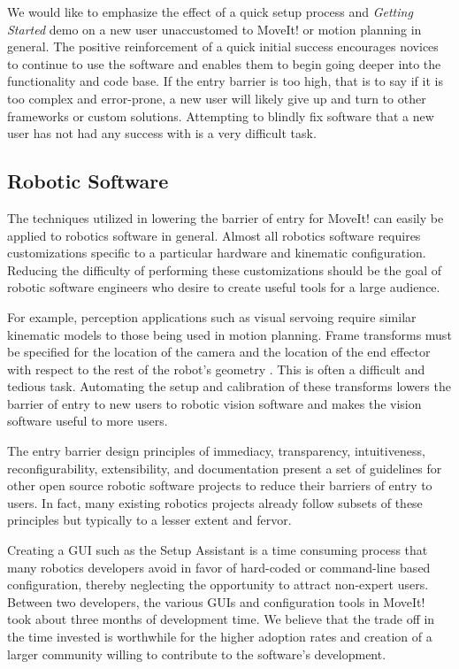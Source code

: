 \documentclass[10pt,journal,compsoc]{joser1}
\begin{document}
{We would like to emphasize the effect of a quick setup process and \textit{Getting Started} demo on a new user unaccustomed to MoveIt! or motion planning in general. The positive reinforcement of a quick initial success encourages novices to continue to use the software and enables them to begin going deeper into the functionality and code base. If the entry barrier is too high, that is to say if it is too complex and error-prone, a new user will likely give up and turn to other frameworks or custom solutions. Attempting to blindly fix software that a new user has not had any success with is a very difficult task.

\subsection{Robotic Software}
\label{sec::robotic_discussion}

The techniques utilized in lowering the barrier of entry for MoveIt! can easily be applied to robotics software in general. Almost all robotics software requires customizations specific to a particular hardware and kinematic configuration. Reducing the difficulty of performing these customizations should be the goal of robotic software engineers who desire to create useful tools for a large audience. 

For example, perception applications such as visual servoing require similar kinematic models to those being used in motion planning. Frame transforms must be specified for the location of the camera and the location of the end effector with respect to the rest of the robot's geometry \cite{visual_servoing}. This is often a difficult and tedious task. Automating the setup and calibration of these transforms lowers the barrier of entry to new users to robotic vision software and makes the vision software useful to more users.

The entry barrier design principles of immediacy, transparency, intuitiveness, reconfigurability, extensibility, and documentation present a set of guidelines for other open source robotic software projects to reduce their barriers of entry to users. In fact, many existing robotics projects already follow subsets of these principles but typically to a lesser extent and fervor.

Creating a GUI such as the Setup Assistant is a time consuming process that many robotics developers avoid in favor of hard-coded or command-line based configuration, thereby neglecting the opportunity to attract non-expert users. Between two developers, the various GUIs and configuration tools in MoveIt! took about three months of development time. We believe that the trade off in the time invested is worthwhile for the higher adoption rates and creation of a larger community willing to contribute to the software's development. 

}
\end{document}
